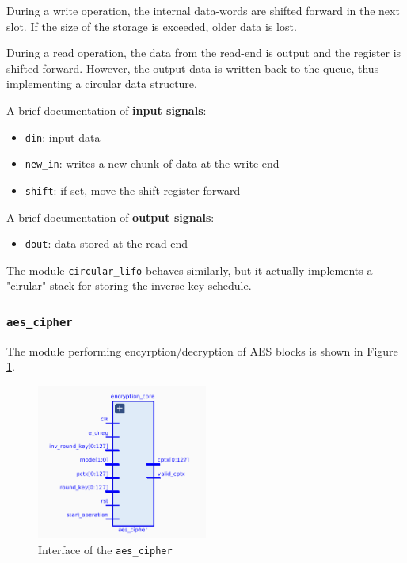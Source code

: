 During a write operation, the internal data-words are shifted forward in the next
slot. If the size of the storage is exceeded, older data is lost.

During a read operation, the data from the read-end is output and the register is
shifted forward. However, the output data is written back to the queue, thus implementing
a circular data structure.

A brief documentation of \textbf{input signals}:
\begin{itemize}
	\item \texttt{din}: input data
	\item \texttt{new\_in}: writes a new chunk of data at the write-end
	\item \texttt{shift}: if set, move the shift register forward
\end{itemize}

A brief documentation of \textbf{output signals}:
\begin{itemize}
	\item \texttt{dout}: data stored at the read end
\end{itemize}

The module \texttt{circular\_lifo} behaves similarly, but it actually implements a
"cirular" stack for storing the inverse key schedule.

\subsubsection{\texttt{aes\_cipher}}

The module performing encyrption/decryption of AES blocks is shown in Figure \ref{fig:aes_cipher}.

\begin{figure}[h]
  \centering
  \includegraphics[width=0.5\textwidth]{figures/aes_cipher}
	  \caption{Interface of the \texttt{aes\_cipher}}
  \label{fig:aes_cipher}
\end{figure}


